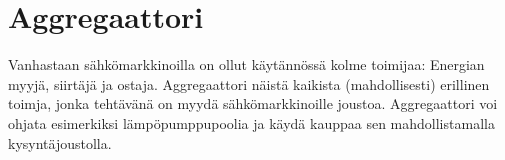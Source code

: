 \section{Aggregaattori}

  Vanhastaan sähkömarkkinoilla on ollut käytännössä kolme toimijaa: Energian myyjä, siirtäjä ja ostaja. Aggregaattori näistä kaikista (mahdollisesti) erillinen toimja, jonka tehtävänä on myydä sähkömarkkinoille joustoa. Aggregaattori voi ohjata esimerkiksi lämpöpumppupoolia ja käydä kauppaa sen mahdollistamalla kysyntäjoustolla.
